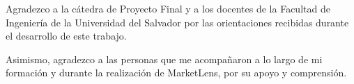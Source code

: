 
Agradezco a la cátedra de Proyecto Final y a los docentes de la Facultad de Ingeniería de la Universidad del Salvador por las orientaciones recibidas durante el desarrollo de este trabajo.

Asimismo, agradezco a las personas que me acompañaron a lo largo de mi formación y durante la realización de MarketLens, por su apoyo y comprensión.

